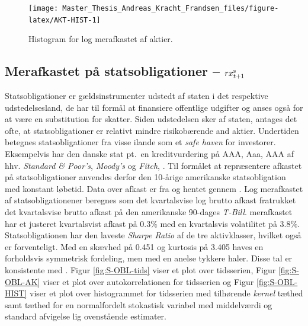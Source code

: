 \documentclass[
  a4paper,
  oneside]{memoir}
\begin{document}
\begin{figure}[H]

{\centering \texttt{[image: Master\_Thesis\_Andreas\_Kracht\_Frandsen\_files/figure-latex/AKT-HIST-1]} 

}

\caption{Histogram for log merafkastet af aktier.}\label{fig:AKT-HIST}
\end{figure}

\hypertarget{merafkastet-puxe5-statsobligationer-rx_t1textnormals}{%
\subsection{\texorpdfstring{Merafkastet på statsobligationer -- \(rx_{t+1}^{\textnormal{s}}\)}{Merafkastet på statsobligationer -- rx\_\{t+1\}\^{}\{\textbackslash textnormal\{s\}\}}}\label{merafkastet-puxe5-statsobligationer-rx_t1textnormals}}

Statsobligationer er gældsinstrumenter udstedt af staten i det respektive udstedelsesland, de har til formål at finansiere offentlige udgifter og anses også for at være en substitution for skatter. Siden udstedelsen sker af staten, antages det ofte, at statsobligationer er relativt mindre risikobærende and aktier. Undertiden betegnes statsobligationer fra visse ilande som et \emph{safe haven} for investorer. Eksempelvis har den danske stat pt.~en kreditvurdering på AAA, Aaa, AAA af hhv. \emph{Standard \& Poor's}, \emph{Moody's} og \emph{Fitch}, \citep{TradingEconomics2020}. Til formålet at repræsentere afkastet på statsobligationer anvendes derfor den 10-årige amerikanske statsobligation med konstant løbetid. Data over afkast er fra \citep{CRSPt90} og hentet gennem \citep{WRDSt90}. Log merafkastet af statsobligationener beregnes som det kvartalsvise log brutto afkast fratrukket det kvartalsvise brutto afkast på den amerikanske 90-dages \emph{T-Bill}. merafkastet har et justeret kvartalsvist afkast på 0.3\(\%\) med en kvartalsvis volatilitet på 3.8\(\%\). Statsobligationen har den laveste \emph{Sharpe Ratio} af de tre aktivklasser, hvilket også er forventeligt. Med en skævhed på 0.451 og kurtosis på 3.405 haves en forholdsvis symmetrisk fordeling, men med en anelse tykkere haler. Disse tal er konsistente med \citep{CampVic2003}. Figur \ref{fig:S-OBL-tids} viser et plot over tidsserien, Figur \ref{fig:S-OBL-AK} viser et plot over autokorrelationen for tidsserien og Figur \ref{fig:S-OBL-HIST} viser et plot over histogrammet for tidsserien med tilhørende \emph{kernel} tæthed samt tæthed for en normalfordelt stokastisk variabel med middelværdi og standard afvigelse lig ovenstående estimater.
\end{document}
